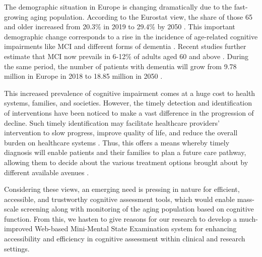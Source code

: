 The demographic situation in Europe is changing dramatically due to the fast-growing aging population. According to the Eurostat view, the share of those 65 and older increased from 20.3\% in 2019 to 29.4\% by 2050 \cite{eurostat2020}. This important demographic change corresponds to a rise in the incidence of age-related cognitive impairments like MCI and different forms of dementia \cite{livingston2020}. Recent studies further estimate that MCI now prevails in 6-12\% of adults aged 60 and above \cite{petersen2018}. During the same period, the number of patients with dementia will grow from 9.78 million in Europe in 2018 to 18.85 million in 2050 \cite{alzheimer2019}.

This increased prevalence of cognitive impairment comes at a huge cost to health systems, families, and societies. However, the timely detection and identification of interventions have been noticed to make a vast difference in the progression of decline. Such timely identification may facilitate healthcare providers' intervention to slow progress, improve quality of life, and reduce the overall burden on healthcare systems \cite{livingston2020}. Thus, this offers a means whereby timely diagnosis will enable patients and their families to plan a future care pathway, allowing them to decide about the various treatment options brought about by different available avenues \cite{sperling2011}.

Considering these views, an emerging need is pressing in nature for efficient, accessible, and trustworthy cognitive assessment tools, which would enable mass-scale screening along with monitoring of the aging population based on cognitive function. From this, we hasten to give reasons for our research to develop a much-improved Web-based Mini-Mental State Examination system for enhancing accessibility and efficiency in cognitive assessment within clinical and research settings.
